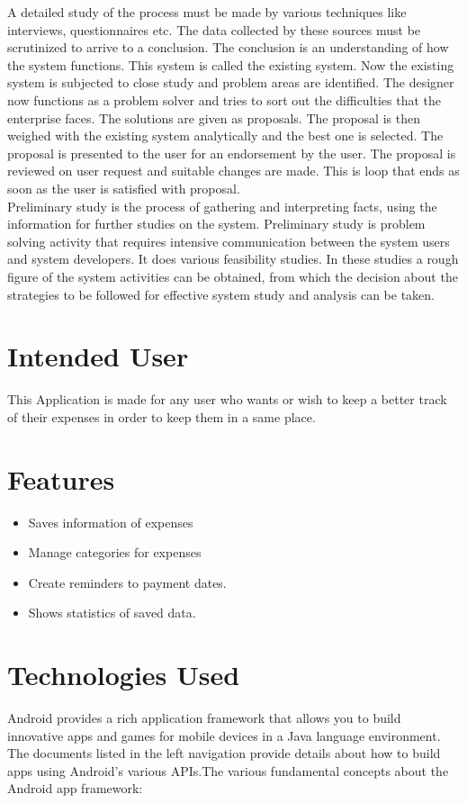 \noindent A detailed study of the process must be made by various techniques like interviews, questionnaires etc. The data collected by these sources must be scrutinized to arrive to a conclusion. The conclusion is an understanding of how the system functions. This system is called the existing system. Now the existing system is subjected to close study and problem areas are identified. The designer now functions as a problem solver and tries to sort out the difficulties that the enterprise faces. The solutions are given as proposals. The proposal is then weighed with the existing system analytically and the best one is selected. The proposal is presented to the user for an endorsement by the user. The proposal is reviewed on user request and suitable changes are made. This is loop that ends as soon as the user is satisfied with proposal.\\

\noindent Preliminary study is the process of gathering and interpreting facts, using the information for further studies on the system. Preliminary study is problem solving activity that requires intensive communication between the system users and system developers. It does various feasibility studies. In these studies a rough figure of the system activities can be obtained, from which the decision about the strategies to be followed for effective system study and analysis can be taken.

\section{Intended User}
This Application is made for any user who wants or wish to keep a better track of their
expenses in order to keep them in a same place.

\section{Features}
\begin{itemize}
	\item Saves information of expenses
	\item Manage categories for expenses
	\item Create reminders to payment dates.
	 \item Shows statistics of saved data.
\end{itemize}


\section{Technologies Used}
Android provides a rich application framework that allows you to build innovative
apps and games for mobile devices in a Java language environment. The documents
listed in the left navigation provide details about how to build apps using Android's
various APIs.The various fundamental concepts about the Android app framework: 

